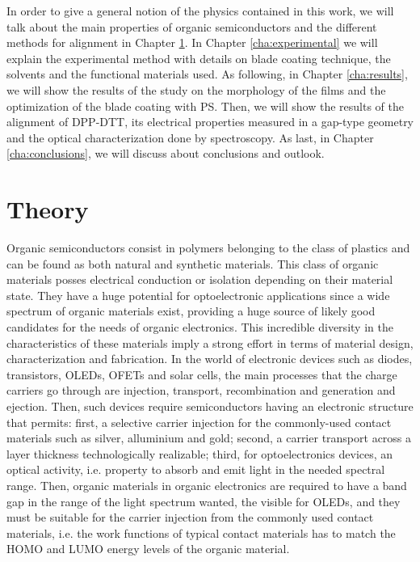 \documentclass  [
  paper    = a4,
  BCOR     = 10mm,
  twoside,
  fontsize = 12pt,
  fleqn,
  toc      = bibnumbered,
  toc      = listofnumbered,
  numbers  = noendperiod,
  headings = normal,
  listof   = leveldown,
  version  = 3.03
]                                       {scrreprt}
\begin{document}
In order to give a general notion of the physics contained in this work, we will talk about the main properties of organic semiconductors and the different methods for alignment in Chapter \ref{cha:theory}. In Chapter \ref{cha:experimental} we will explain the experimental method with details on blade coating technique, the solvents and the functional materials used. As following, in Chapter \ref{cha:results}, we will show the results of the study on the morphology of the films and the optimization of the blade coating with PS. Then, we will show the results of the alignment of DPP-DTT, its electrical properties measured in a gap-type geometry and the optical characterization done by spectroscopy. As last, in Chapter \ref{cha:conclusions}, we will discuss about conclusions and outlook.


\chapter{Theory}\label{cha:theory}


Organic semiconductors consist in polymers belonging to the class of plastics and can be found as both natural and synthetic materials. This class of organic materials posses electrical conduction or isolation depending on their material state. They have a huge potential for optoelectronic applications since a wide spectrum of organic materials exist, providing a huge source of likely good candidates for the needs of organic electronics. This incredible diversity in the characteristics of these materials imply a strong effort in terms of material design, characterization and fabrication. In the world of electronic devices such as diodes, transistors, OLEDs, OFETs and solar cells, the main processes that the charge carriers go through are injection, transport, recombination and generation and ejection. Then, such devices require semiconductors having an electronic structure that permits: first, a selective carrier injection for the commonly-used contact materials such as silver, alluminium and gold; second, a carrier transport across a layer thickness technologically realizable; third, for optoelectronics devices, an optical activity, i.e. property to absorb and emit light in the needed spectral range. Then, organic materials in organic electronics are required to have a band gap in the range of the light spectrum wanted, the visible for OLEDs, and they must be suitable for the carrier injection from the commonly used contact materials, i.e. the work functions of typical contact materials has to match the HOMO and LUMO energy levels of the organic material.\\
 
\end{document}
